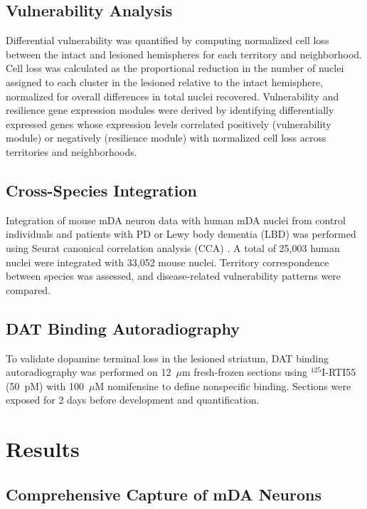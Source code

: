 \documentclass[12pt]{article}
\begin{document}
\subsection{Vulnerability Analysis}

Differential vulnerability was quantified by computing normalized cell loss between the intact and lesioned hemispheres for each territory and neighborhood. Cell loss was calculated as the proportional reduction in the number of nuclei assigned to each cluster in the lesioned relative to the intact hemisphere, normalized for overall differences in total nuclei recovered. Vulnerability and resilience gene expression modules were derived by identifying differentially expressed genes whose expression levels correlated positively (vulnerability module) or negatively (resilience module) with normalized cell loss across territories and neighborhoods.

\subsection{Cross-Species Integration}

Integration of mouse mDA neuron data with human mDA nuclei from control individuals and patients with PD or Lewy body dementia (LBD) was performed using Seurat canonical correlation analysis (CCA) \citep{stuart2019comprehensive}. A total of 25,003 human nuclei were integrated with 33,052 mouse nuclei. Territory correspondence between species was assessed, and disease-related vulnerability patterns were compared.

\subsection{DAT Binding Autoradiography}

To validate dopamine terminal loss in the lesioned striatum, DAT binding autoradiography was performed on 12~$\mu$m fresh-frozen sections using $^{125}$I-RTI55 (50~pM) with 100~$\mu$M nomifensine to define nonspecific binding. Sections were exposed for 2 days before development and quantification.

\section{Results}

\subsection{Comprehensive Capture of mDA Neurons}
\end{document}

